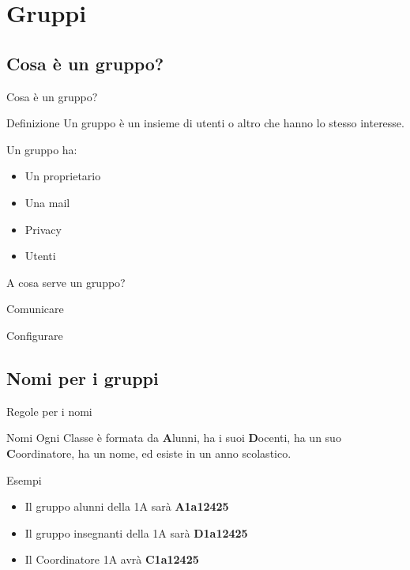 \section{Gruppi}
\subsection{Cosa è un gruppo?}
\begin{frame}{Cosa è un gruppo?}
	\begin{alertblock}{Definizione}
	Un gruppo è un insieme di utenti o altro che hanno lo stesso interesse.
	\end{alertblock}
	Un gruppo ha:
	\begin{itemize}
		\item Un proprietario
		\item Una mail
		\item Privacy
		\item Utenti
	\end{itemize}
\end{frame}
\begin{frame}{A cosa serve un gruppo?}
	\begin{block}{}
		Comunicare
	\end{block}
	\begin{block}{}
		Configurare
	\end{block}
\end{frame}
\subsection{Nomi per i gruppi}
\begin{frame}{Regole per i nomi}
	\begin{alertblock}{Nomi}
		Ogni Classe è formata da \textbf{A}lunni, ha i suoi \textbf{D}ocenti, ha un suo \textbf{C}oordinatore, ha un nome, ed esiste in un anno scolastico.
	\end{alertblock}
	\begin{block}{Esempi}
		\begin{itemize}
			\item 	Il gruppo alunni della 1A sarà \textbf{A1a12425}
			\item 	Il gruppo insegnanti della 1A sarà \textbf{D1a12425}
			\item 	Il Coordinatore  1A avrà \textbf{C1a12425}
		\end{itemize}
	\end{block}
\end{frame}